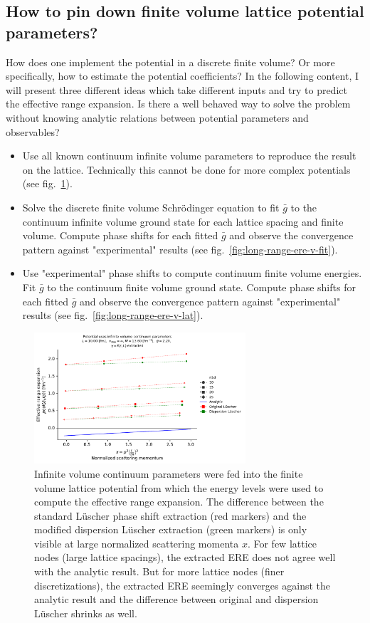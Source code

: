 \documentclass[
    aps,
    prl,
    showkeys,
    nofootinbib,
    floatfix
]{revtex4-1}
\begin{document}
\subsection{How to pin down finite volume lattice potential parameters?}
How does one implement the potential in a discrete finite volume?
Or more specifically, how to estimate the potential coefficients?
In the following content, I will present three different ideas which take different inputs and try to predict the effective range expansion.
Is there a well behaved way to solve the problem without knowing analytic relations between potential parameters and observables?

\begin{itemize}
	\item Use all known continuum infinite volume parameters to reproduce the result on the lattice.
		Technically this cannot be done for more complex potentials (see fig.~\ref{fig:long-range-ere-v-inf-cont}). 
	\item Solve the discrete finite volume Schrödinger equation to fit $\bar g$ to the continuum infinite volume ground state for each lattice spacing and finite volume.
		Compute phase shifts for each fitted $\bar g$ and observe the convergence pattern against "experimental" results (see fig.~\ref{fig:long-range-ere-v-fit}).
	\item Use "experimental" phase shifts to compute continuum finite volume energies.
		Fit $\bar g$ to the continuum finite volume ground state.
		Compute phase shifts for each fitted $\bar g$ and observe the convergence pattern against "experimental" results (see fig.~\ref{fig:long-range-ere-v-lat}).
\end{itemize}

\begin{figure}[!htb]
\includegraphics[width=0.7\textwidth]{figs/long-range-ere-v-inf-cont.pdf}
\caption{
	\label{fig:long-range-ere-v-inf-cont}
	Infinite volume continuum parameters were fed into the finite volume lattice potential from which the energy levels were used to compute the effective range expansion.
	The difference between the standard Lüscher phase shift extraction (red markers) and the modified dispersion Lüscher extraction (green markers) is only visible at large normalized scattering momenta $x$.
	For few lattice nodes (large lattice spacings), the extracted ERE does not agree well with the analytic result.
	But for more lattice nodes (finer discretizations), the extracted ERE seemingly converges against the analytic result and the difference between original and dispersion Lüscher shrinks as well.
}
\end{figure}
\end{document}
